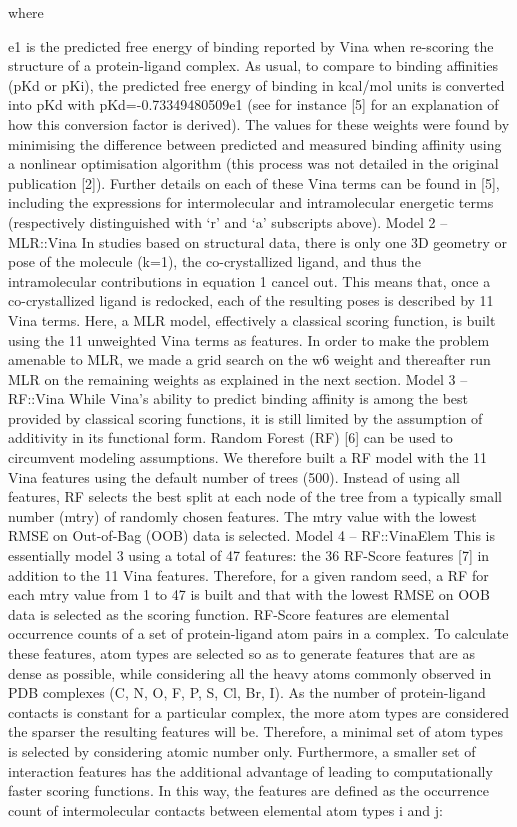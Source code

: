 \documentclass[twocolumn]{bmcart}
\begin{document}
where
 
 
 

e1 is the predicted free energy of binding reported by Vina when re-scoring the structure of a protein-ligand complex. As usual, to compare to binding affinities (pKd or pKi), the predicted free energy of binding in kcal/mol units is converted into pKd with pKd=-0.73349480509e1 (see for instance [5] for an explanation of how this conversion factor is derived). The values for these weights were found by minimising the difference between predicted and measured binding affinity using a nonlinear optimisation algorithm (this process was not detailed in the original publication [2]).  Further details on each of these Vina terms can be found in [5], including the expressions for intermolecular and intramolecular energetic terms (respectively distinguished with ‘r’ and ‘a’ subscripts above). 
Model 2 – MLR::Vina
In studies based on structural data, there is only one 3D geometry or pose of the molecule (k=1), the co-crystallized ligand, and thus the intramolecular contributions in equation 1 cancel out. This means that, once a co-crystallized ligand is redocked, each of the resulting poses is described by 11 Vina terms. Here, a MLR model, effectively a classical scoring function, is built using the 11 unweighted Vina terms as features. In order to make the problem amenable to MLR, we made a grid search on the w6 weight and thereafter run MLR on the remaining weights as explained in the next section.
Model 3 – RF::Vina
While Vina’s ability to predict binding affinity is among the best provided by classical scoring functions, it is still limited by the assumption of additivity in its functional form. Random Forest (RF) [6] can be used to circumvent modeling assumptions. We therefore built a RF model with the 11 Vina features using the default number of trees (500). Instead of using all features, RF selects the best split at each node of the tree from a typically small number (mtry) of randomly chosen features. The mtry value with the lowest RMSE on Out-of-Bag (OOB) data is selected. 
Model 4 – RF::VinaElem
This is essentially model 3 using a total of 47 features: the 36 RF-Score features [7] in addition to the 11 Vina features. Therefore, for a given random seed, a RF for each mtry value from 1 to 47 is built and that with the lowest RMSE on OOB data is selected as the scoring function. RF-Score features are elemental occurrence counts of a set of protein-ligand atom pairs in a complex. To calculate these features, atom types are selected so as to generate features that are as dense as possible, while considering all the heavy atoms commonly observed in PDB complexes (C, N, O, F, P, S, Cl, Br, I). As the number of protein-ligand contacts is constant for a particular complex, the more atom types are considered the sparser the resulting features will be. Therefore, a minimal set of atom types is selected by considering atomic number only. Furthermore, a smaller set of interaction features has the additional advantage of leading to computationally faster scoring functions. In this way, the features are defined as the occurrence count of intermolecular contacts between elemental atom types i and j:
 
\end{document}
